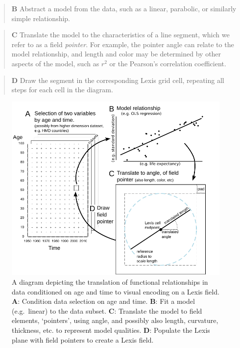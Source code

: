 \documentclass[10pt, twoside, parskip=half]{article}
\begin{document}
\begin{quote}
\textbf{B} Abstract a model from the data, such as a linear, parabolic, or similarly simple relationship.
\end{quote}

\begin{quote}
\textbf{C} Translate the model to the characteristics of a line segment, which we refer to as a field \emph{pointer}. For example, the pointer angle can relate to the model relationship, and length and color may be determined by other aspects of the model, such as \(r^2\) or the Pearson's correlation coefficient.
\end{quote}

\begin{quote}
\textbf{D} Draw the segment in the corresponding Lexis grid cell, repeating all steps for each cell in the diagram.
\end{quote}



\begin{figure}[!t]
\includegraphics[width=1\linewidth]{Figures/ExplainerDiagram} \caption{A diagram depicting the translation of functional relationships in data conditioned on age and time to visual encoding on a Lexis field. \textbf{A}: Condition data selection on age and time. \textbf{B}: Fit a model (e.g.~linear) to the data subset. \textbf{C}: Translate the model to field elements, `pointers', using angle, and possibly also length, curvature, thickness, etc. to represent model qualities. \textbf{D}: Populate the Lexis plane with field pointers to create a Lexis field.}\label{fig:one}
\end{figure}
\FloatBarrier
\end{document}
